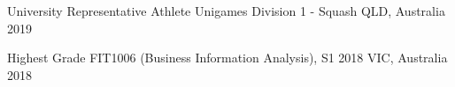 
\begin{cvhonors}

  \cvhonor
    {University Representative Athlete} %
    {Unigames Division 1 - Squash} %
    {QLD, Australia} %
    {2019} %
    
  \cvhonor
    {Highest Grade} %
    {FIT1006 (Business Information Analysis), S1 2018} %
    {VIC, Australia} %
    {2018} %


\end{cvhonors}

